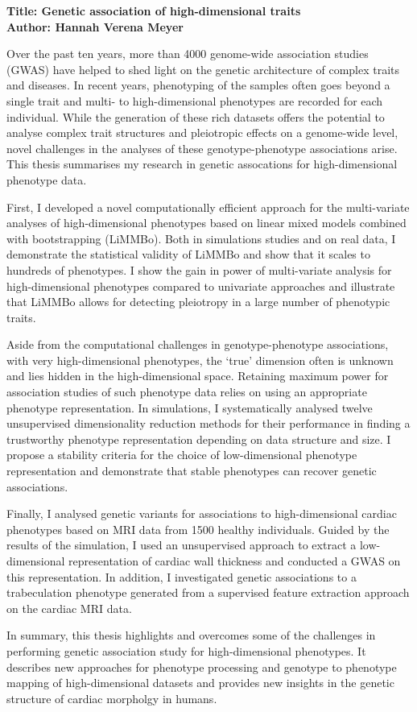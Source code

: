 \documentclass{thesis}
\begin{document}
\noindent\textbf{Title: Genetic association of high-dimensional traits}
\\
\textbf{Author: Hannah Verena Meyer}
\begin{singlespace}
Over the past ten years, more than \num{4000} genome-wide association studies (GWAS) have helped to shed light on the genetic architecture of complex traits and diseases.   In recent years, phenotyping of the samples often goes beyond a single trait and multi- to high-dimensional phenotypes are recorded for each individual. While the generation of these rich datasets offers the potential to analyse complex trait structures and pleiotropic effects on a genome-wide level, novel challenges in the analyses of these genotype-phenotype associations arise. This thesis summarises my research in genetic assocations for high-dimensional phenotype data.

First, I developed a novel computationally efficient approach for the multi-variate analyses of high-dimensional phenotypes based on linear mixed models combined with bootstrapping (LiMMBo). Both in simulations studies and on real data, I demonstrate the statistical validity of LiMMBo and show that it scales to hundreds of phenotypes. I show the gain in power of multi-variate analysis for high-dimensional phenotypes compared to univariate approaches and illustrate that LiMMBo allows for detecting pleiotropy in a large number of phenotypic traits. 

Aside from the computational challenges in genotype-phenotype associations, with very high-dimensional phenotypes, the `true' dimension often is unknown and lies hidden in the high-dimensional space. Retaining maximum power for association studies of such phenotype data relies on using an appropriate phenotype representation.  In simulations, I systematically analysed twelve unsupervised dimensionality reduction methods for their performance in finding a trustworthy phenotype representation depending on data structure and size. I propose a stability criteria for the choice of low-dimensional phenotype representation and demonstrate that stable phenotypes can recover genetic associations. 

Finally, I analysed genetic variants for associations to high-dimensional cardiac phenotypes based on MRI data from \num{1500} healthy individuals. Guided by the results of the simulation, I used an unsupervised approach to extract a low-dimensional representation of cardiac wall thickness and conducted a GWAS on this representation. In addition, I investigated genetic associations to a trabeculation phenotype generated from a supervised feature extraction approach on the cardiac MRI data.

In summary, this thesis highlights and overcomes some of the challenges in performing genetic association study for high-dimensional phenotypes. It describes new approaches for phenotype processing and genotype to phenotype mapping of high-dimensional datasets and provides new insights in the genetic structure of cardiac morpholgy in humans.


\end{singlespace}
\end{document}
